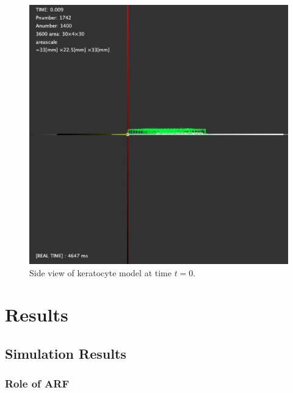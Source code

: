\documentclass[a4paper,12pt]{book}
\begin{document}
\begin{figure}[tbp]
\centering
\includegraphics[scale=0.25]{side.eps}
\caption{Side view of keratocyte model at time $t=0$.}
\label{fig:side0}
\end{figure}

\chapter{Results}
\section{Simulation Results}
\subsection{Role of ARF}
\end{document}
